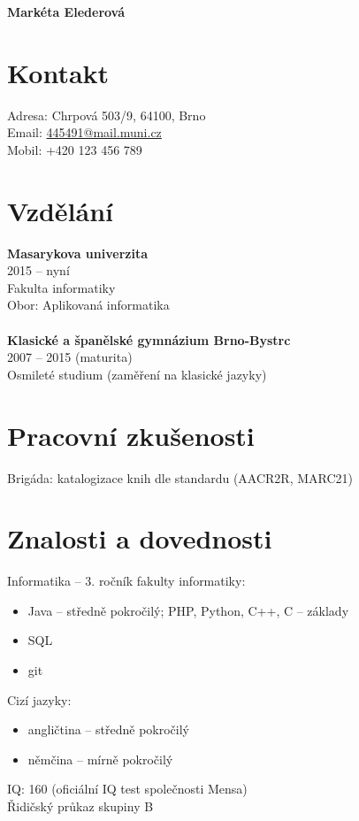 \documentclass[letterpaper,12pt,oneside]{article}
\begin{document}
\noindent  \LARGE{\textbf{Markéta Elederová}}

\normalsize

\section*{Kontakt}
 Adresa: Chrpová 503/9, 64100, Brno  \\
 Email: \href{mailto:445491@mail.muni.cz}{445491@mail.muni.cz} \\
 Mobil: +420 123 456 789
 
\section*{Vzdělání}
\textbf{Masarykova univerzita} \\
2015 – nyní \\
Fakulta informatiky \\
Obor: Aplikovaná informatika \\
\\
\textbf{Klasické a španělské gymnázium Brno-Bystrc} \\
2007 – 2015 (maturita) \\
Osmileté studium (zaměření na klasické jazyky)

\section*{Pracovní zkušenosti}
Brigáda: katalogizace knih dle standardu (AACR2R, MARC21)
    
\section*{Znalosti a dovednosti}
Informatika – 3. ročník fakulty informatiky:
\begin{itemize}[label={--}, noitemsep]
\item Java – středně pokročilý; PHP, Python, C++, C – základy
\item SQL
\item git
\end{itemize}

\noindent
Cizí jazyky:
\begin{itemize}[label={--},noitemsep]
\item angličtina – středně pokročilý
\item němčina – mírně pokročilý
\end{itemize}

\noindent
IQ: 160 (oficiální IQ test společnosti Mensa) \\
Řidičský průkaz skupiny B
\end{document}
